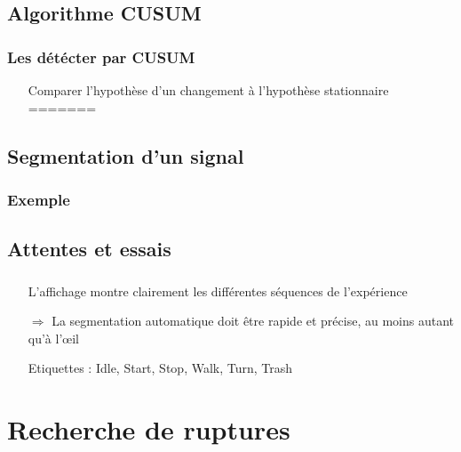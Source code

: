 \documentclass{beamer}
\begin{document}
\begin{frame}
\begin{document}
\begin{frame}
\end{frame}

\subsection{Algorithme CUSUM}

\begin{frame}

	\frametitle{Les détécter par CUSUM}

	\begin{itemize}
		\item[Comparer] l'hypothèse d'un changement à l'hypothèse stationnaire
=======
	\end{itemize}	
\end{frame}

\subsection{Segmentation d'un signal}
\begin{frame}
	\frametitle{Exemple}
\end{frame}
\subsection{Attentes et essais}

\begin{frame}
	\frametitle{}
	\begin{itemize}
		\item[L'affichage] montre clairement les différentes séquences de l'expérience
		\item[$\Longrightarrow$] La segmentation automatique doit être rapide et précise, au moins autant qu'à l'œil
		
		\item[Etiquettes]: Idle, Start, Stop, Walk, Turn, Trash
		
	\end{itemize}
\end{frame}

\section{Recherche de ruptures}


\end{document}
\end{frame}
\end{document}
